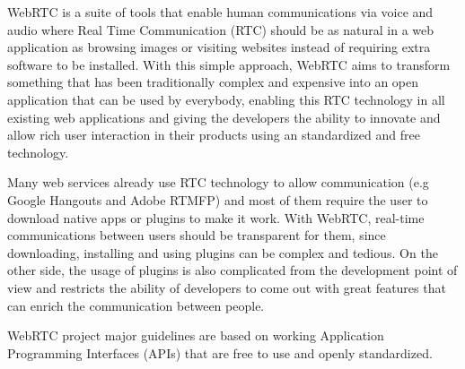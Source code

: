 WebRTC is a suite of tools that enable human communications via voice and audio where Real Time Communication (RTC) should be as natural in a web application as browsing images or visiting websites instead of requiring extra software to be installed. With this simple approach, WebRTC aims to transform something that has been traditionally complex and expensive into an open application that can be used by everybody, enabling this RTC technology in all existing web applications and giving the developers the ability to innovate and allow rich user interaction in their products using an standardized and free technology.

Many web services already use RTC technology to allow communication (e.g Google Hangouts and Adobe RTMFP) and most of them require the user to download native apps or plugins to make it work. With WebRTC, real-time communications between users should be transparent for them, since downloading, installing and using plugins can be complex and tedious. On the other side, the usage of plugins is also complicated from the development point of view and restricts the ability of developers to come out with great features that can enrich the communication between people.

WebRTC project major guidelines are based on working Application Programming Interfaces (APIs)  that are free to use and openly standardized.



